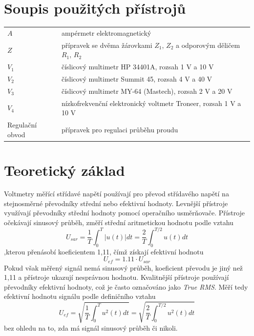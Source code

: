 \documentclass{article}
\begin{document}
\section{Soupis použitých přístrojů}
\begin{tabular}{ll}
	$A$ & ampérmetr elektromagnetický \\
	$Z$ & přípravek se dvěma žárovkami $Z_1$, $Z_2$ a odporovým děličem $R_1$, $R_2$ \\
	$V_1$ & číslicový multimetr HP 34401A, rozsah 1 V a 10 V \\
	$V_2$ & číslicový multimetr Summit 45, rozsah 4 V a 40 V \\
	$V_3$ & číslicový multimetr MY-64 (Mastech), rozsah 2 V a 20 V \\
	$V_4$ & nízkofrekvenční elektronický voltmetr Troneer, rozsah 1 V a 10 V \\
	Regulační obvod & přípravek pro regulaci průběhu proudu
\end{tabular}
\section{Teoretický základ}
Voltmetry měřící střídavé napětí používají pro převod střídavého napětí na stejnosměrné
převodníky střední nebo efektivní hodnoty.
Levnější přístroje využívají převodníky střední hodnoty pomocí operačního usměrňovače.
Přístroje očekávají sinusový průběh, změří střední aritmetickou hodnotu podle vztahu
\begin{equation}
	U_{sar}=\frac{1}{T}\int_{0}^{T}|u(t)|dt=\frac{2}{T}\int_{0}^{T/2}u(t)dt
\end{equation}
,kterou přenásobí koeficientem 1,11, čímž získají efektivní hodnotu
\begin{equation}
	U_{ef} = 1.11 \cdot U_{sar}
\end{equation}
Pokud však měřený signál nemá sinusový průběh, koeficient převodu je jiný než 1,11 a přístroje ukazují nesprávnou hodnotu.
Kvalitnější přístroje používají převodníky efektivní hodnoty, což je často označováno jako
\textit{True RMS}. Měří tedy efektivní hodnotu signálu podle definičního vztahu
\begin{equation}
	U_{ef} = \sqrt{\frac{1}{T}\int_{0}^{T}u^2(t)dt}=\sqrt{\frac{2}{T}\int_{0}^{T/2}u^2(t)dt}
\end{equation}
bez ohledu na to, zda má signál sinusový průběh či nikoli.
\end{document}
